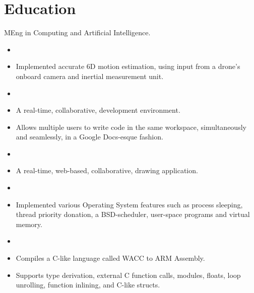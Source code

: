 \documentclass{jcgcv}
\begin{document}
\begin{column}

\section{Education}
MEng in Computing and Artificial Intelligence.

\begin{adjustwidth}{0.3cm}{}

\begin{itemize}
  \item {}
  \item Implemented accurate 6D motion estimation, using input from a drone's onboard camera and inertial measurement unit.
\end{itemize}

\begin{itemize}
  \item {}
  \item A real-time, collaborative, development environment.
  \item Allows multiple users to write code in the same workspace, simultaneously and seamlessly, in a Google Docs-esque fashion.
\end{itemize}

\begin{itemize}
  \item {}
  \item A real-time, web-based, collaborative, drawing application.
\end{itemize}

\begin{itemize}
  \item {}
  \item Implemented various Operating System features such as process sleeping, thread priority donation, a BSD-scheduler, user-space programs and virtual memory.
\end{itemize}

\begin{itemize}
  \item {}
  \item Compiles a C-like language called WACC to ARM Assembly.
  \item Supports type derivation, external C function calls, modules, floats, loop unrolling, function inlining, and C-like structs.
\end{itemize}


\end{adjustwidth}
\end{column}
\end{document}
